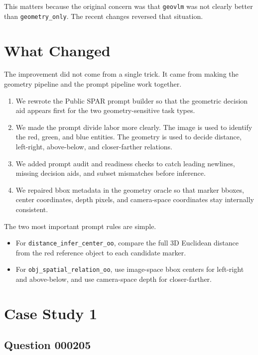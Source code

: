 \documentclass[11pt]{article}
\newcommand{\track}[1]{\texttt{#1}}
\begin{document}
This matters because the original concern was that \track{geovlm} was not clearly better than \track{geometry\_only}. The recent changes reversed that situation.

\section{What Changed}

The improvement did not come from a single trick. It came from making the geometry pipeline and the prompt pipeline work together.

\begin{enumerate}[leftmargin=18pt,itemsep=2pt]
    \item We rewrote the Public SPAR prompt builder so that the geometric decision aid appears first for the two geometry-sensitive task types.
    \item We made the prompt divide labor more clearly. The image is used to identify the red, green, and blue entities. The geometry is used to decide distance, left-right, above-below, and closer-farther relations.
    \item We added prompt audit and readiness checks to catch leading newlines, missing decision aids, and subset mismatches before inference.
    \item We repaired bbox metadata in the geometry oracle so that marker bboxes, center coordinates, depth pixels, and camera-space coordinates stay internally consistent.
\end{enumerate}

The two most important prompt rules are simple.

\begin{itemize}[leftmargin=18pt,itemsep=1pt]
    \item For \track{distance\_infer\_center\_oo}, compare the full 3D Euclidean distance from the red reference object to each candidate marker.
    \item For \track{obj\_spatial\_relation\_oo}, use image-space bbox centers for left-right and above-below, and use camera-space depth for closer-farther.
\end{itemize}

\section{Case Study 1}

\subsection{Question 000205}
\end{document}
